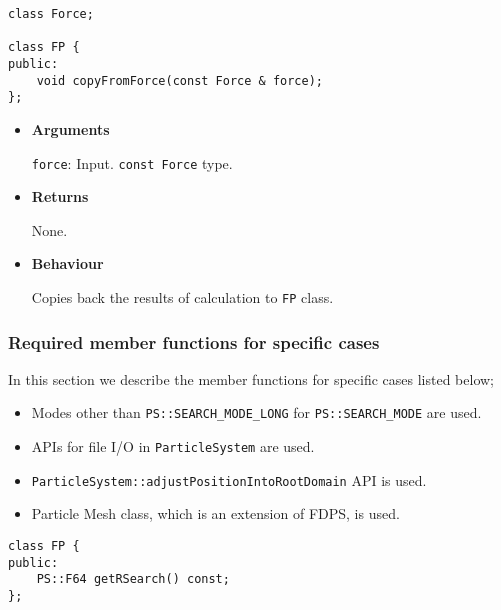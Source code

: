 
\begin{screen}
\begin{verbatim}
class Force;

class FP {
public:
    void copyFromForce(const Force & force);
};
\end{verbatim}
\end{screen}

\begin{itemize}

\item {\bf Arguments}

  \texttt{force}: Input. \texttt{const Force} type.
  
\item {\bf Returns}

  None.
  
\item {\bf Behaviour}

  Copies back the results of calculation to \texttt{FP} class.

\end{itemize}

\subsubsection{Required member functions for specific cases}


In this section we describe the member functions for specific cases listed below;
\begin{itemize}
\item{} Modes other than \texttt{PS::SEARCH\_MODE\_LONG} for \texttt{PS::SEARCH\_MODE} are used.
\item{} APIs for file I/O in \texttt{ParticleSystem} are used.
\item{} \texttt{ParticleSystem::adjustPositionIntoRootDomain} API is used.
\item{} Particle Mesh class, which is an extension of FDPS, is used.
\end{itemize}



\begin{screen}
\begin{verbatim}
class FP {
public:
    PS::F64 getRSearch() const;
};
\end{verbatim}
\end{screen}

